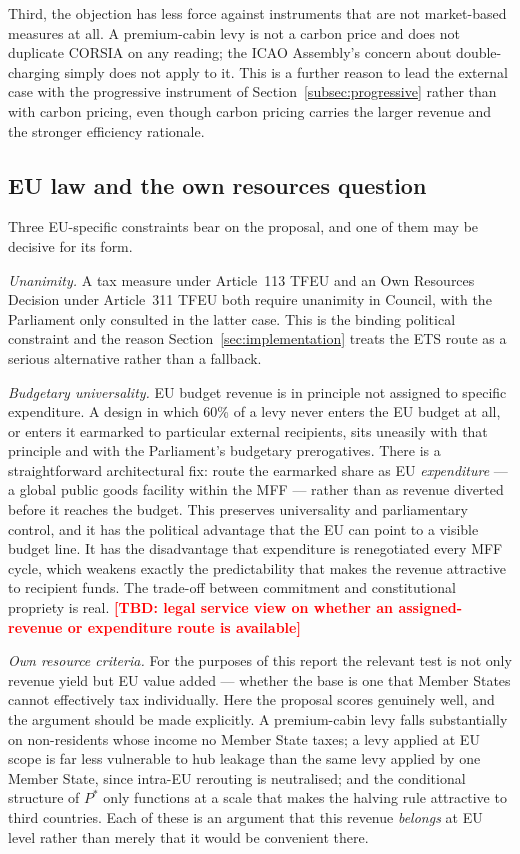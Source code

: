 \documentclass[11pt]{article}
\newcommand{\tbd}[1]{\textcolor{red}{\textbf{[TBD: #1]}}}
\begin{document}
Third, the objection has less force against instruments that are not
market-based measures at all. A premium-cabin levy is not a carbon price and does
not duplicate CORSIA on any reading; the ICAO Assembly's concern about
double-charging simply does not apply to it. This is a further reason to lead the
external case with the progressive instrument of
Section~\ref{subsec:progressive} rather than with carbon pricing, even though
carbon pricing carries the larger revenue and the stronger efficiency rationale.

\subsection{EU law and the own resources question}
\label{subsec:ownresources}

Three EU-specific constraints bear on the proposal, and one of them may be
decisive for its form.

\emph{Unanimity.} A tax measure under Article~113 TFEU and an Own Resources
Decision under Article~311 TFEU both require unanimity in Council, with the
Parliament only consulted in the latter case. This is the binding political
constraint and the reason Section~\ref{sec:implementation} treats the ETS route
as a serious alternative rather than a fallback.

\emph{Budgetary universality.} EU budget revenue is in principle not assigned to
specific expenditure. A design in which 60\% of a levy never enters the EU budget
at all, or enters it earmarked to particular external recipients, sits uneasily
with that principle and with the Parliament's budgetary prerogatives. There is a
straightforward architectural fix: route the earmarked share as EU
\emph{expenditure} --- a global public goods facility within the MFF --- rather
than as revenue diverted before it reaches the budget. This preserves
universality and parliamentary control, and it has the political advantage that
the EU can point to a visible budget line. It has the disadvantage that
expenditure is renegotiated every MFF cycle, which weakens exactly the
predictability that makes the revenue attractive to recipient funds. The
trade-off between commitment and constitutional propriety is real.
\tbd{legal service view on whether an assigned-revenue or expenditure route is
available}

\emph{Own resource criteria.} For the purposes of this report the relevant test
is not only revenue yield but EU value added --- whether the base is one that
Member States cannot effectively tax individually. Here the proposal scores
genuinely well, and the argument should be made explicitly. A premium-cabin levy
falls substantially on non-residents whose income no Member State taxes; a
levy applied at EU scope is far less vulnerable to hub leakage than the same levy
applied by one Member State, since intra-EU rerouting is neutralised; and the
conditional structure of $P^{*}$ only functions at a scale that makes the halving
rule attractive to third countries. Each of these is an argument that this
revenue \emph{belongs} at EU level rather than merely that it would be
convenient there.
\end{document}
